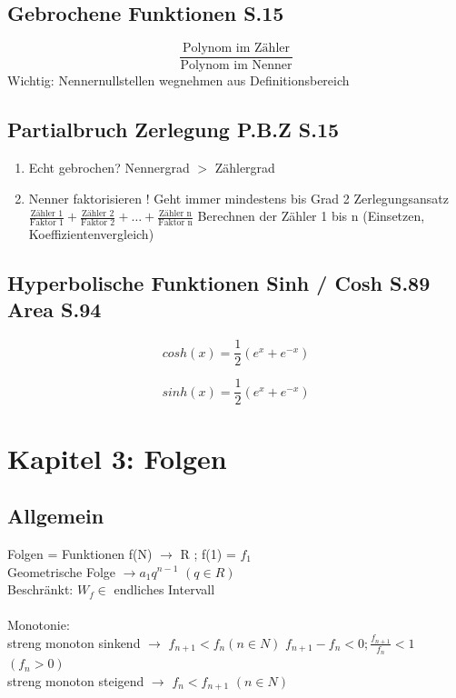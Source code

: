\documentclass{article}
\begin{document}
	\subsection{Gebrochene Funktionen S.15}
	\begin{equation}
			\frac{\textrm{Polynom im Zähler}}{\textrm{Polynom im Nenner}}
	\end{equation}
	Wichtig: Nennernullstellen wegnehmen aus Definitionsbereich
	\subsection{Partialbruch Zerlegung P.B.Z S.15}
	\begin{enumerate}
		\item Echt gebrochen? Nennergrad $>$ Zählergrad 
		\item Nenner faktorisieren ! Geht immer mindestens bis Grad 2
		\subitem Zerlegungsansatz $\frac{\textrm{Zähler 1}}{\textrm{Faktor 1}} + \frac{\textrm{Zähler 2}}{\textrm{Faktor 2}} + \dots + \frac{\textrm{Zähler n}}{\textrm{Faktor n}}$
		\subitem Berechnen der Zähler 1 bis n (Einsetzen, Koeffizientenvergleich)
	\end{enumerate}
	\subsection{Hyperbolische Funktionen Sinh / Cosh S.89 Area S.94}
	\begin{multicols}{2}
	\begin{center}
	\begin{equation*}
	    cosh(x) = \frac{1}{2}(e^x+e^{-x})
	\end{equation*}
	\end{center}
	\columnbreak
	\begin{center}
	\begin{equation*}
	    sinh(x) = \frac{1}{2}(e^x+e^{-x})
	\end{equation*}
	\end{center}
	\end{multicols}
	
	\newpage
		\section{Kapitel 3: Folgen}
	\subsection{Allgemein}
	Folgen = Funktionen f(N) $\rightarrow$ R ; f(1) = $f_1$ \\
	Geometrische Folge $\rightarrow a_1q^{n-1}$ $(q \in R)$ \\
	Beschränkt: $W_f \in$ endliches Intervall \\ \\
	Monotonie: \\
	streng monoton sinkend $\rightarrow$ $f_{n+1} < f_n (n \in N)$ $f_{n+1} - f_n < 0; \frac{f_{n+1}}{f_n} < 1$ $(f_n > 0)$ \\
	streng monoton steigend $\rightarrow$ $f_n < f_{n+1}$ $(n \in N)$
\end{document}
